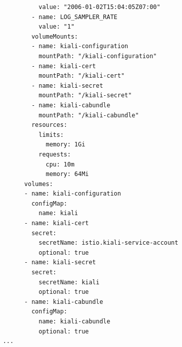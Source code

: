 \documentclass[14pt,a4paper]{book}
\begin{document}
{{\begin{lstlisting}
			  value: "2006-01-02T15:04:05Z07:00"
			- name: LOG_SAMPLER_RATE
			  value: "1"
			volumeMounts:
			- name: kiali-configuration
			  mountPath: "/kiali-configuration"
			- name: kiali-cert
			  mountPath: "/kiali-cert"
			- name: kiali-secret
			  mountPath: "/kiali-secret"
			- name: kiali-cabundle
			  mountPath: "/kiali-cabundle"
			resources:
			  limits:
				memory: 1Gi
			  requests:
				cpu: 10m
				memory: 64Mi
		  volumes:
		  - name: kiali-configuration
			configMap:
			  name: kiali
		  - name: kiali-cert
			secret:
			  secretName: istio.kiali-service-account
			  optional: true
		  - name: kiali-secret
			secret:
			  secretName: kiali
			  optional: true
		  - name: kiali-cabundle
			configMap:
			  name: kiali-cabundle
			  optional: true
	...
	
\end{lstlisting}

}}
\end{document}
